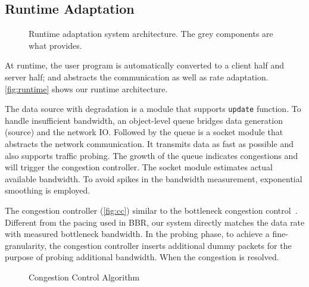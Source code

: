 \subsection{Runtime Adaptation}
\label{sec:runtime}

\begin{figure}
  \centering
  \resizebox{\columnwidth}{!}{
    
  }
  \caption{Runtime adaptation system architecture. The grey components are what
    \sysname{} provides.}
  \label{fig:runtime}
\end{figure}

At runtime, the user program is automatically converted to a client half and
server half; and \sysname{} abstracts the communication as well as rate
adaptation. \autoref{fig:runtime} shows our runtime architecture.

The data source with degradation is a module that supports \texttt{update}
function. To handle insufficient bandwidth, an object-level queue bridges data
generation (source) and the network IO. Followed by the queue is a socket module
that abstracts the network communication. It transmits data as fast as possible
and also supports traffic probing. The growth of the queue indicates congestions
and will trigger the congestion controller. The socket module estimates actual
available bandwidth. To avoid spikes in the bandwidth measurement, exponential
smoothing is employed.

The congestion controller (\autoref{fig:cc}) similar to the bottleneck congestion
control~\cite{cardwell2017bbr}. Different from the pacing used in BBR, our
system directly matches the data rate with measured bottleneck bandwidth. In the
probing phase, to achieve a fine-granularity, the congestion controller inserts
additional dummy packets for the purpose of probing additional bandwidth. When
the congestion is resolved.

\begin{figure}
  \centering
  \resizebox{\columnwidth}{!}{
    
  }
  \caption{Congestion Control Algorithm}
  \label{fig:cc}
\end{figure}

